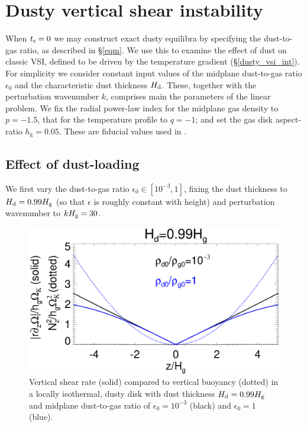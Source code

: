 \section{
  Dusty vertical shear instability}\label{results} 

When $t_\mathrm{s}=0$ we may construct exact dusty equilibra by specifying
the dust-to-gas ratio, as described in \S\ref{eqm}. We use this to
examine the effect of dust on classic VSI, defined to be driven by the
temperature gradient (\S\ref{dusty_vsi_int}). For simplicity we
consider constant input values of the midplane dust-to-gas ratio
$\epsilon_0$ and the characteristic dust thickness $H_\mathrm{d}$. These,
together with the perturbation wavenumber $k$, comprises main the
parameters of the linear problem. We fix the radial power-law index
for the midplane gas density to $p = -1.5$, that for the
temperature profile to $q=-1$; and set the gas disk aspect-ratio
$h_\mathrm{g}=0.05$. These are fiducial values used in . 

\subsection{Effect of dust-loading}
We first vary the dust-to-gas ratio $\epsilon_0\in[10^{-3},1]$,
fixing the dust thickness to $H_\mathrm{d}=0.99H_\mathrm{g}$ (so that $\epsilon$ is
roughly constant with height) and perturbation
wavenumber to $kH_\mathrm{g} = 30$. 


\begin{figure}
  \includegraphics[width=\linewidth]{figures/compare_vshear_Nz2_fixHd} 
  \caption{Vertical shear rate (solid) compared to vertical buoyancy (dotted) in a locally isothermal, dusty disk
    with dust thickness $H_\mathrm{d}=0.99H_\mathrm{g}$ and midplane dust-to-gas ratio
    of $\epsilon_0=10^{-3}$ (black) and $\epsilon_0=1$ (blue). 
    \label{compare_vshear_fixHd}
    }
\end{figure}




